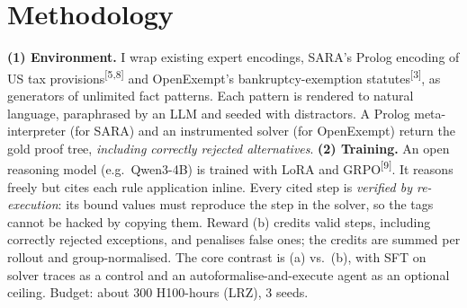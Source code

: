 \documentclass[10pt,a4paper]{article}
\newcommand{\cit}[1]{\textsuperscript{\color{muted}[#1]}}
\newcommand{\step}[1]{\textbf{\color{tum}#1}}
\begin{document}
\section{Methodology}
\begin{center}\vspace{-4pt}
\vspace{-5pt}
\end{center}
\step{(1) Environment.} I wrap existing expert encodings, SARA's Prolog encoding of US tax provisions\cit{5,8} and OpenExempt's bankruptcy-exemption statutes\cit{3}, as generators of unlimited fact patterns. Each pattern is rendered to natural language, paraphrased by an LLM and seeded with distractors. A Prolog meta-interpreter (for SARA) and an instrumented solver (for OpenExempt) return the gold proof tree, \emph{including correctly rejected alternatives}.
\step{(2) Training.} An open reasoning model (e.g.\ Qwen3-4B) is trained with LoRA and GRPO\cit{9}. It reasons freely but cites each rule application inline. Every cited step is \emph{verified by re-execution}: its bound values must reproduce the step in the solver, so the tags cannot be hacked by copying them. Reward (b) credits valid steps, including correctly rejected exceptions, and penalises false ones; the credits are summed per rollout and group-normalised. The core contrast is (a) vs.\ (b), with SFT on solver traces as a control and an autoformalise-and-execute agent as an optional ceiling. Budget: about 300 H100-hours (LRZ), 3 seeds.
\end{document}
